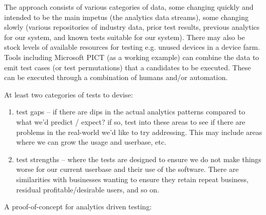 The approach consists of various categories of data, some changing quickly and intended to be the main impetus (the analytics data streams), some changing slowly (various repositories of industry data, prior test results, previous analytics for our system, and known tests suitable for our system). There may also be stock levels of available resources for testing e.g. unused devices in a device farm.
Tools including Microsoft PICT (as a working example) can combine the data to emit test cases (or test permutations) that a candidates to be executed. These can be executed through a combination of humans and/or automation. 

At least two categories of tests to devise:
\begin{enumerate}
    \item test gaps – if there are dips in the actual analytics patterns compared to what we’d predict / expect? if so, test into these areas to see if there are problems in the real-world we’d like to try addressing. This may include areas where we can grow the usage and userbase, etc.
    \item test strengths – where the tests are designed to ensure we do not make things worse for our current userbase and their use of the software. There are similarities with businesses wanting to ensure they retain repeat business, residual profitable/desirable users, and so on.
\end{enumerate}

A proof-of-concept for analytics driven testing: 



